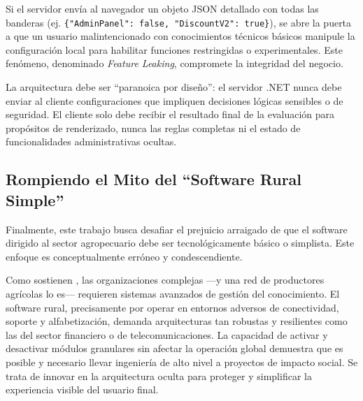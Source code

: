 Si el servidor envía al navegador un objeto JSON detallado con todas las banderas (ej. \texttt{\{"AdminPanel": false, "DiscountV2": true\}}), se abre la puerta a que un usuario malintencionado con conocimientos técnicos básicos manipule la configuración local para habilitar funciones restringidas o experimentales. Este fenómeno, denominado \textit{Feature Leaking}, compromete la integridad del negocio.

La arquitectura debe ser ``paranoica por diseño'': el servidor .NET nunca debe enviar al cliente configuraciones que impliquen decisiones lógicas sensibles o de seguridad. El cliente solo debe recibir el resultado final de la evaluación para propósitos de renderizado, nunca las reglas completas ni el estado de funcionalidades administrativas ocultas.

\subsection{Rompiendo el Mito del ``Software Rural Simple''}

Finalmente, este trabajo busca desafiar el prejuicio arraigado de que el software dirigido al sector agropecuario debe ser tecnológicamente básico o simplista. Este enfoque es conceptualmente erróneo y condescendiente.

Como sostienen \cite{garcia2007informacion}, las organizaciones complejas —y una red de productores agrícolas lo es— requieren sistemas avanzados de gestión del conocimiento. El software rural, precisamente por operar en entornos adversos de conectividad, soporte y alfabetización, demanda arquitecturas tan robustas y resilientes como las del sector financiero o de telecomunicaciones. La capacidad de activar y desactivar módulos granulares sin afectar la operación global demuestra que es posible y necesario llevar ingeniería de alto nivel a proyectos de impacto social. Se trata de innovar en la arquitectura oculta para proteger y simplificar la experiencia visible del usuario final.
